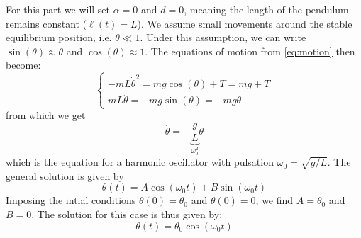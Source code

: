 For this part we will set \(\alpha=0\) and \(d=0\), meaning the length of the pendulum remains constant (\(\ell(t)=L\)). We assume small movements around the stable equilibrium position, i.e. \(\theta \ll 1\). Under this assumption, we can write \(\sin(\theta) \approx \theta\) and \(\cos(\theta) \approx 1\). The equations of motion from \autoref{eq:motion} then become:
\begin{equation}
    \begin{cases}
        -m L \dot\theta^2 = mg\cos(\theta) + T = mg + T \\
        m L \ddot\theta = -mg\sin(\theta) = -mg\theta
    \end{cases}
\end{equation}
from which we get
\begin{equation}
    \ddot\theta = - \underbrace{\frac{g}{L}}_{\omega_0^2} \theta
\end{equation}
which is the equation for a harmonic oscillator with pulsation $\omega_0 = \sqrt{g/L}$. The general solution is given by
\begin{equation}
    \theta(t) = A\cos(\omega_0 t) + B\sin(\omega_0 t)
\end{equation}
Imposing the intial conditions \(\theta(0) = \theta_0\) and \(\dot\theta(0) = 0\), we find \(A = \theta_0\) and \(B = 0\). The solution for this case is thus given by:
\begin{equation}
    \theta(t) = \theta_0 \cos(\omega_0 t)
\end{equation}
